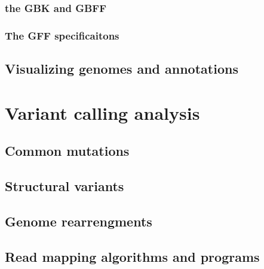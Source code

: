 \documentclass[
  letterpaper,
]{scrbook}
\begin{document}
\hypertarget{the-gbk-and-gbff}{%
\subsection{the GBK and GBFF}\label{the-gbk-and-gbff}}

\hypertarget{the-gff-specificaitons}{%
\subsection{The GFF specificaitons}\label{the-gff-specificaitons}}

\hypertarget{visualizing-genomes-and-annotations}{%
\section{Visualizing genomes and
annotations}\label{visualizing-genomes-and-annotations}}

\hypertarget{variant-calling-analysis}{%
\chapter{Variant calling analysis}\label{variant-calling-analysis}}

\hypertarget{common-mutations}{%
\section*{Common mutations}\label{common-mutations}}

\hypertarget{structural-variants}{%
\section*{Structural variants}\label{structural-variants}}

\hypertarget{genome-rearrengments}{%
\section*{Genome rearrengments}\label{genome-rearrengments}}

\hypertarget{read-mapping-algorithms-and-programs}{%
\section*{Read mapping algorithms and
programs}\label{read-mapping-algorithms-and-programs}}
\end{document}
